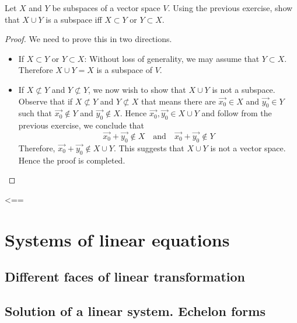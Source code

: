 \documentclass{article}
\begin{document}
\begin{exercise}
  Let $X$ and $Y$ be subspaces of a vector space $V$. Using the previous
  exercise, show that $X\cup Y$ is a subspace iff $X\subset Y$ or 
  $Y\subset X$.
\end{exercise}
\begin{proof}
  We need to prove this in two directions.
  \begin{itemize}
    \item If $X\subset Y$ or $Y\subset X$: Without loss of generality, 
      we may assume that $Y\subset X$. Therefore $X\cup Y=X$ is a 
      subspace of $V$.
    \item If $X\not\subset Y$ and $Y\not\subset Y$, we now wish to show that
      $X\cup Y$ is not a subspace. Observe that if
      $X\not\subset Y$ and $Y\not\subset X$ that means there are 
      $\vec{x_0}\in X$ and $\vec{y_0}\in Y$ such that $\vec{x_0}\notin Y$
      and $\vec{y_0}\notin X$. Hence $\vec{x_0},\vec{y_0}\in X\cup Y$ and
      follow from the previous exercise, we conclude that
      \[
        \vec{x_0}+\vec{y_0}\notin X
        \quad\text{and}\quad
        \vec{x_0}+\vec{y_0}\notin Y
      \]
      Therefore, $\vec{x_0}+\vec{y_0}\notin X\cup Y$. This suggests that
      $X\cup Y$ is not a vector space. Hence the proof is completed.
  \end{itemize}
\end{proof}
<==
\chapter{Systems of linear equations}

\section{Different faces of linear transformation}
\section{Solution of a linear system. Echelon forms}
\end{document}
